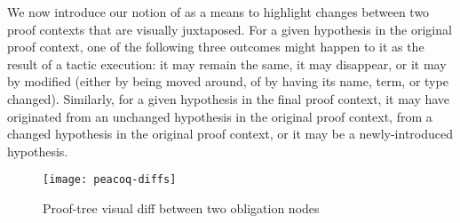 We now introduce our notion of  as a means to highlight
changes between two proof contexts that are visually juxtaposed.  For a given
hypothesis in the original proof context, one of the following three outcomes
might happen to it as the result of a tactic execution: it may remain the same,
it may disappear, or it may by modified (either by being moved around, of by
having its name, term, or type changed).  Similarly, for a given hypothesis in
the final proof context, it may have originated from an unchanged hypothesis in
the original proof context, from a changed hypothesis in the original proof
context, or it may be a newly-introduced hypothesis.


\begin{figure*}[!htp]
\texttt{[image: peacoq-diffs]}{\parfillskip=0pt\par}
\caption{Proof-tree visual diff between two obligation nodes}%
\label{proof-tree-diffs}
\end{figure*}
